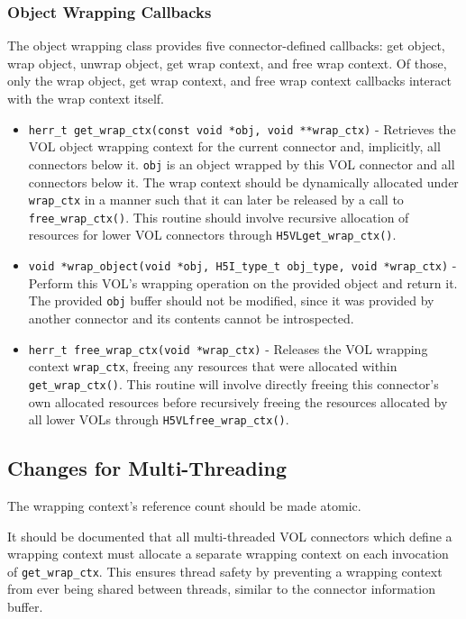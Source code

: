 \documentclass{article}
\begin{document}
\subsubsection{Object Wrapping Callbacks}

The object wrapping class provides five connector-defined callbacks: get object, wrap object, unwrap object, get wrap context, and free wrap context. Of those, only the wrap object, get wrap context, and free wrap context callbacks interact with the wrap context itself.

\begin{itemize}
    \item \texttt{herr\_t get\_wrap\_ctx(const void *obj, void **wrap\_ctx)} - Retrieves the VOL object wrapping context for the current connector and, implicitly, all connectors below it. \texttt{obj} is an object wrapped by this VOL connector and all connectors below it. The wrap context should be dynamically allocated under \texttt{wrap\_ctx} in a manner such that it can later be released by a call to \texttt{free\_wrap\_ctx()}. This routine should involve recursive allocation of resources for lower VOL connectors through \texttt{H5VLget\_wrap\_ctx()}.
    
    \item \texttt{void *wrap\_object(void *obj, H5I\_type\_t obj\_type, void *wrap\_ctx)} - Perform this VOL's wrapping operation on the provided object and return it. The provided \texttt{obj} buffer should not be modified, since it was provided by another connector and its contents cannot be introspected.

    \item \texttt{herr\_t free\_wrap\_ctx(void *wrap\_ctx)} - Releases the VOL wrapping context \texttt{wrap\_ctx}, freeing any resources that were allocated within \texttt{get\_wrap\_ctx()}. This routine will involve directly freeing this connector's own allocated resources before recursively freeing the resources allocated by all lower VOLs through \texttt{H5VLfree\_wrap\_ctx()}.
\end{itemize}

\subsection{Changes for Multi-Threading}

The wrapping context's reference count should be made atomic.

It should be documented that all multi-threaded VOL connectors which define a wrapping context must allocate a separate wrapping context on each invocation of \texttt{get\_wrap\_ctx}. This ensures thread safety by preventing a wrapping context from ever being shared between threads, similar to the connector information buffer.
\end{document}
